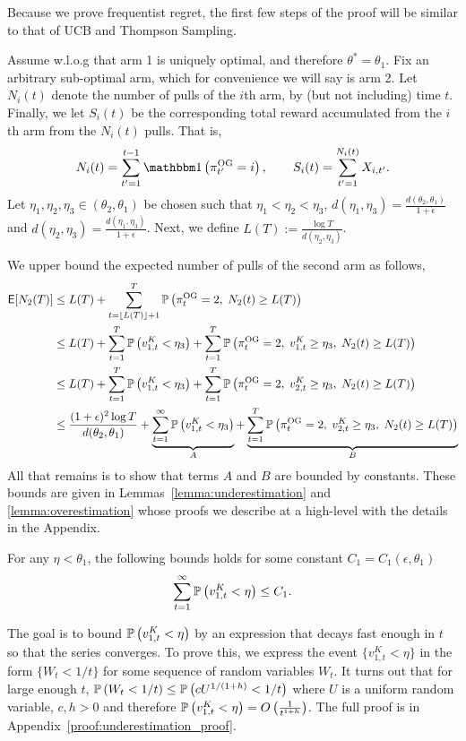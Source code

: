 \begin{myproof}[Proof.]
	Because we prove frequentist regret, the first few steps of the proof will be similar to that of UCB and Thompson Sampling.
	
	Assume w.l.o.g that arm 1 is uniquely optimal, and therefore $\theta^* = \theta_1$. Fix an arbitrary sub-optimal arm, which for convenience we will say is arm 2. Let $N_i(t)$ denote the number of pulls of the $i$th arm, by (but not including) time $t$. Finally, we let $S_i(t)$ be the corresponding total reward accumulated from the $i$th arm from the $N_i(t)$ pulls. That is,
	\[
	N_i(t) = \sum_{t'=1}^{t-1} \ind{\pi^{\rm OG}_{t'} = i}, \qquad S_i(t) = \sum_{t'=1}^{N_i(t)} X_{i,t'}.
	\]
	Let $\eta_1,\eta_2,\eta_3 \in (\theta_2, \theta_1)$ be chosen such that $\eta_1 < \eta_2 < \eta_3$, $d(\eta_1, \eta_3) = \frac{d(\theta_2, \theta_1)}{1+\epsilon}$ and $d(\eta_2,\eta_3) =\frac{d(\eta_1, \eta_3)}{1+\epsilon} $. Next, we define $L(T) := \frac{\log T}{d(\eta_2,\eta_3)}$.
	
	We upper bound the expected number of pulls of the second arm as follows,
	\begin{align}
	\E[N_2(T)] & \le L(T) + \sum_{t=\floor{L(T)}+1}^T \P{\pi^{\rm OG}_t = 2, \; N_2(t) \ge L(T)} \nonumber \\
	& \le L(T) +   \sum_{t=1}^T \P{v^K_{1,t} < \eta_3} + \sum_{t=1}^T \P{\pi^{\rm OG}_t = 2,\; v^K_{1,t} \ge \eta_3, \; N_2(t) \ge L(T)} \nonumber \\
	& \le L(T) +   \sum_{t=1}^T \P{v^K_{1,t} < \eta_3} + \sum_{t=1}^T \P{\pi^{\rm OG}_t = 2,\; v^K_{2,t} \ge \eta_3, \; N_2(t) \ge L(T)} \nonumber \\
	& \le \frac{(1+\epsilon)^2 \log T}{d(\theta_2, \theta_1)} + \underbrace{\sum_{t=1}^\infty \P{v^K_{1,t} < \eta_3}}_{A} + \underbrace{\sum_{t=1}^T \P{\pi^{\rm OG}_t = 2,\;v^K_{2,t} \ge \eta_3, \; N_2(t) \ge L(T)}}_{B} \label{bound:final_step_in_freq_regret}
	\end{align}
	All that remains is to show that terms $A$ and $B$ are bounded by constants. These bounds are given in Lemmas~\ref{lemma:underestimation} and \ref{lemma:overestimation} whose proofs we describe at a high-level with the details in the Appendix.
	\begin{lemma} \label{lemma:underestimation}
		For any $\eta < \theta_1$, the following bounds holds for some constant $C_1 = C_1(\epsilon, \theta_1)$
		\begin{equation*}
		\sum_{t=1}^\infty \P{v^K_{1,t} < \eta} \le C_1.
		\end{equation*}
	\end{lemma}
	\begin{myproof}
		The goal is to bound $\P{v^K_{1,t} < \eta}$ by an expression that decays fast enough in $t$ so that the series converges. To prove this, we express the event $\{v^K_{1,t} < \eta\}$ in the form $\{W_t < 1/t\}$ for some sequence of random variables $W_t$. It  turns out that for large enough $t$, $\P{W_t < 1/t} \le \P{c U^{1/(1+h)} < 1/t}$ where $U$ is a uniform random variable, $c, h > 0$ and therefore $\P{v^K_{1,t} < \eta} = O\left(\frac{1}{t^{1+h}}\right)$. The full proof is in Appendix~\ref{proof:underestimation_proof}.
		

\end{myproof}
\end{myproof}
